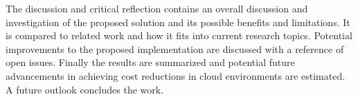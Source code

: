 The discussion and critical reflection contains an overall discussion and investigation of the proposed solution and its possible benefits and limitations. It is compared to related work and how it fits into current research topics. Potential improvements to the proposed implementation are discussed with a reference of open issues. 
Finally the results are summarized and potential future advancements in achieving cost reductions in cloud environments are estimated. A future outlook concludes the work. 


